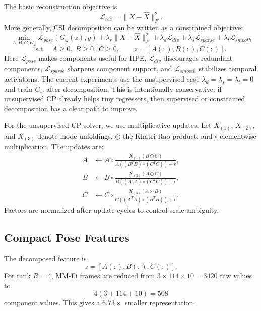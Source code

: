 \documentclass[letterpaper]{article}
\begin{document}
The basic reconstruction objective is
\begin{equation}
\mathcal{L}_{rec}=\|X-\hat{X}\|_F^2.
\end{equation}
More generally, CSI decomposition can be written as a constrained objective:
\begin{equation}
\min_{A,B,C,G_\omega}
\mathcal{L}_{pose}(G_\omega(z),y)
+\lambda_r\|X-\hat{X}\|_F^2
+\lambda_d\mathcal{L}_{div}
+\lambda_s\mathcal{L}_{sparse}
+\lambda_t\mathcal{L}_{smooth}
\end{equation}
\begin{equation}
\text{s.t.}\quad A\ge0,\;B\ge0,\;C\ge0,\qquad
z=[A(:),B(:),C(:)].
\end{equation}
Here $\mathcal{L}_{pose}$ makes components useful for HPE, $\mathcal{L}_{div}$ discourages redundant components, $\mathcal{L}_{sparse}$ sharpens component support, and $\mathcal{L}_{smooth}$ stabilizes temporal activations. The current experiments use the unsupervised case $\lambda_d=\lambda_s=\lambda_t=0$ and train $G_\omega$ after decomposition. This is intentionally conservative: if unsupervised CP already helps tiny regressors, then supervised or constrained decomposition has a clear path to improve.

For the unsupervised CP solver, we use multiplicative updates. Let $X_{(1)}$, $X_{(2)}$, and $X_{(3)}$ denote mode unfoldings, $\odot$ the Khatri-Rao product, and $\circ$ elementwise multiplication. The updates are:
\begin{align}
A &\leftarrow A\circ
\frac{X_{(1)}(B\odot C)}
{A((B^TB)\circ(C^TC))+\epsilon},\\
B &\leftarrow B\circ
\frac{X_{(2)}(A\odot C)}
{B((A^TA)\circ(C^TC))+\epsilon},\\
C &\leftarrow C\circ
\frac{X_{(3)}(A\odot B)}
{C((A^TA)\circ(B^TB))+\epsilon}.
\end{align}
Factors are normalized after update cycles to control scale ambiguity.

\subsection{Compact Pose Features}

The decomposed feature is
\begin{equation}
z=[A(:),B(:),C(:)].
\end{equation}
For rank $R=4$, MM-Fi frames are reduced from $3\times114\times10=3420$ raw values to
\begin{equation}
4(3+114+10)=508
\end{equation}
component values. This gives a $6.73\times$ smaller representation.
\end{document}
